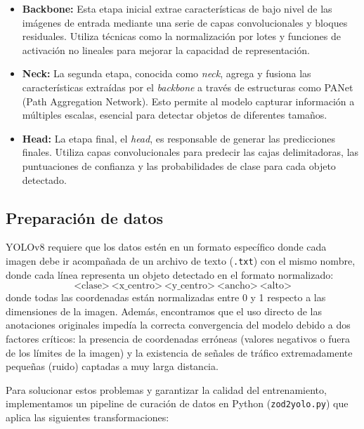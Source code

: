\documentclass[11pt,a4paper]{article}
\begin{document}
\begin{itemize}
    \item \textbf{Backbone:} Esta etapa inicial extrae características de bajo nivel de las imágenes de entrada mediante 
            una serie de capas convolucionales y bloques residuales. Utiliza técnicas como la normalización por lotes 
            y funciones de activación no lineales para mejorar la capacidad de representación.
    
    \item \textbf{Neck:} La segunda etapa, conocida como \textit{neck}, agrega y fusiona las características extraídas por el 
            \textit{backbone} a través de estructuras como PANet (Path Aggregation Network). Esto permite al modelo 
            capturar información a múltiples escalas, esencial para detectar objetos de diferentes tamaños.

    \item \textbf{Head:} La etapa final, el \textit{head}, es responsable de generar las predicciones finales. 
            Utiliza capas convolucionales para predecir las cajas delimitadoras, las puntuaciones de confianza y 
            las probabilidades de clase para cada objeto detectado.
\end{itemize}

\subsection{Preparación de datos}

YOLOv8 requiere que los datos estén en un formato específico donde cada imagen debe ir acompañada de un archivo de texto (\texttt{.txt}) 
con el mismo nombre, donde cada línea representa un objeto detectado en el formato normalizado:
\[ \text{<clase>} \ \text{<x\_centro>} \ \text{<y\_centro>} \ \text{<ancho>} \ \text{<alto>} \]
donde todas las coordenadas están normalizadas entre 0 y 1 respecto a las dimensiones de la imagen.
Además, encontramos que el uso directo de las anotaciones originales impedía la correcta convergencia del modelo 
debido a dos factores críticos: la presencia de coordenadas erróneas (valores negativos o fuera de los límites de la imagen) y la existencia 
de señales de tráfico extremadamente pequeñas (ruido) captadas a muy larga distancia.

Para solucionar estos problemas y garantizar la calidad del entrenamiento, 
implementamos un pipeline de curación de datos en Python (\texttt{zod2yolo.py}) que 
aplica las siguientes transformaciones:
\end{document}
